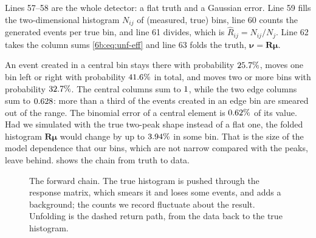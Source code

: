
Lines 57--58 are the whole detector: a flat truth and a Gaussian error. Line 59 fills the
two-dimensional histogram $N_{ij}$ of (measured, true) bins, line 60 counts the generated events
per true bin, and line 61 divides, which is $\hat R_{ij}=N_{ij}/N_j$. Line 62 takes the column sums
\eqref{6b:eq:unf-eff} and line 63 folds the truth, $\bm\nu=\mathbf R\bm\mu$.

An event created in a central bin stays there with probability $25.7\%$, moves one bin
left or right with probability $41.6\%$ in total, and moves two or more bins with
probability $32.7\%$. The central columns sum to $1$, while the two edge
columns sum to $0.628$: more than a third of the events created in an edge bin are
smeared out of the range. The binomial error of a central element is $0.62\%$ of its
value. Had we simulated with the true two-peak shape instead of a flat one, the folded
histogram $\mathbf R\bm\mu$ would change by up to $3.94\%$ in some bin. That is the
size of the model dependence that our bins, which are not narrow compared with the peaks,
leave behind.  shows the chain from truth to data.

\begin{figure}[htbp]
\centering
{}
\caption{The forward chain. The true histogram is pushed through the response matrix, which
smears it and loses some events, and adds a background; the counts we record fluctuate about
the result. Unfolding is the dashed return path, from the data back to the true histogram.}
\label{6b:fig:unf-chain}
\end{figure}

